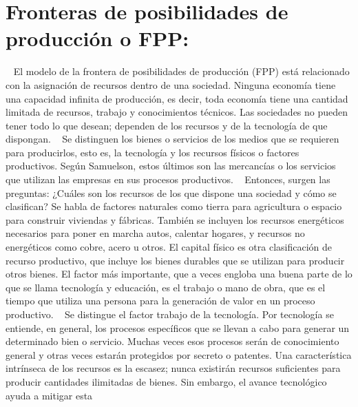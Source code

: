 \documentclass[
  letterpaper,
  DIV=11,
  numbers=noendperiod]{scrreport}
\begin{document}

\hypertarget{fronteras-de-posibilidades-de-producciuxf3n-o-fpp}{%
\section{Fronteras de posibilidades de producción o
FPP:}\label{fronteras-de-posibilidades-de-producciuxf3n-o-fpp}}

~ El modelo de la frontera de posibilidades de producción (FPP) está
relacionado con la asignación de recursos dentro de una sociedad.
Ninguna economía tiene una capacidad infinita de producción, es decir,
toda economía tiene una cantidad limitada de recursos, trabajo y
conocimientos técnicos. Las sociedades no pueden tener todo lo que
desean; dependen de los recursos y de la tecnología de que dispongan. ~
Se distinguen los bienes o servicios de los medios que se requieren para
producirlos, esto es, la tecnología y los recursos físicos o factores
productivos. Según Samuelson, estos últimos son las mercancías o los
servicios que utilizan las empresas en sus procesos productivos. ~
Entonces, surgen las preguntas: ¿Cuáles son los recursos de los que
dispone una sociedad y cómo se clasifican? Se habla de factores
naturales como tierra para agricultura o espacio para construir
viviendas y fábricas. También se incluyen los recursos energéticos
necesarios para poner en marcha autos, calentar hogares, y recursos no
energéticos como cobre, acero u otros. El capital físico es otra
clasificación de recurso productivo, que incluye los bienes durables que
se utilizan para producir otros bienes. El factor más importante, que a
veces engloba una buena parte de lo que se llama tecnología y educación,
es el trabajo o mano de obra, que es el tiempo que utiliza una persona
para la generación de valor en un proceso productivo. ~ Se distingue el
factor trabajo de la tecnología. Por tecnología se entiende, en general,
los procesos específicos que se llevan a cabo para generar un
determinado bien o servicio. Muchas veces esos procesos serán de
conocimiento general y otras veces estarán protegidos por secreto o
patentes. Una característica intrínseca de los recursos es la escasez;
nunca existirán recursos suficientes para producir cantidades ilimitadas
de bienes. Sin embargo, el avance tecnológico ayuda a mitigar esta
\end{document}

